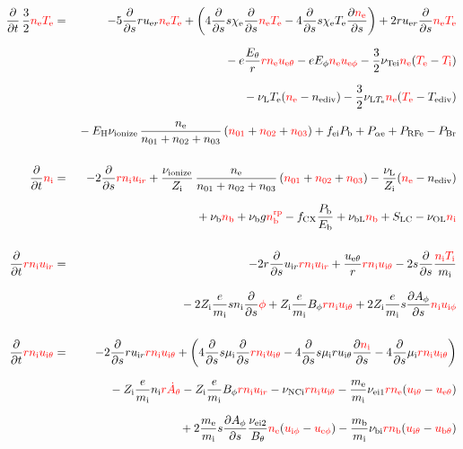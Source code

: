 \documentclass[11pt]{article}
\def\r#1{{\rm#1}}
\def\ddt{\frac{\partial}{\partial t}}
\def\dds{\frac{\partial}{\partial s}}
\def\dd#1{\frac{\partial #1}{\partial s}}
\def\me{m_\r{e}}
\def\mi{m_\r{i}}
\def\mb{m_\r{b}}
\def\mui{\mu_\r{i}}
\def\chie{\chi_\r{e}}
\def\nee{n_\r{e}}
\def\ni{n_\r{i}}
\def\nb{n_\r{b}}
\def\uer{u_{\r{e}r}}
\def\uir{u_{\r{i}r}}
\def\ueth{u_{\r{e}\theta}}
\def\uith{u_{\r{i}\theta}}
\def\ubth{u_{\r{b}\theta}}
\def\ueph{u_{\r{e}\phi}}
\def\uiph{u_{\r{i}\phi}}
\def\ubph{u_{\r{b}\phi}}
\def\Eth{E_\theta}
\def\Eph{E_\phi}
\def\Bth{B_\theta}
\def\Bph{B_\phi}
\def\Athd{\dot{A}_\theta}
\def\Aph{A_\phi}
\def\Te{T_\r{e}}
\def\Ti{T_\r{i}}
\def\nna{n_{01}}
\def\nnb{n_{02}}
\def\nnc{n_{03}}
\def\Zi{Z_\r{i}}
\def\Pb{P_\r{b}}
\def\Eb{E_\r{b}}
\def\PRFe{P_\r{RFe}}
\def\PBr{P_\r{Br}}
\def\EH{E_\r{H}}
\def\fei{f_\r{ei}}
\def\nbrp{n_\r{b}^\r{rp}}
\def\fCX{f_\r{CX}}
\def\Palpe{P_{\alpha\r{e}}}
\def\nuNCi{\nu_\r{NCi}}
\def\nube{\nu_\r{be}}
\def\nubi{\nu_\r{bi}}
\def\nuL{\nu_\r{L}}
\def\nuion{\nu_\r{ionize}}
\def\nub{\nu_\r{b}}
\def\nuTei{\nu_\r{Tei}}
\def\vb{v_\r{b}}
\def\nediv{n_\r{ediv}}
\def\Tediv{T_\r{ediv}}
\def\nuLTe{\nu_{\r{L}T_\r{e}}}
\def\nuOL{\nu_\r{OL}}
\def\nubL{\nu_\r{bL}}
\def\red#1{\textcolor{red}{#1}}
\begin{document}
\begin{eqnarray}
\\[5mm]
  \ddt \, \frac{3}{2} \red{\nee \Te} &=&
%
   - 5 \dds r \uer \red{\nee \Te}
%
   + \left(   4 \dds s \chie \dds \red{\nee \Te}
%
            - 4 \dds s \chie \Te \dd{\red{\nee}} \right)
%
  + 2 r \uer \dds \red{\nee \Te}
%
\nonumber\\[2.5mm]&&{}
%
  -  e \frac{\Eth}{r} \red{r \nee \ueth}
%
  -  e \Eph \red{\nee \ueph} 
%
  - \frac{3}{2} \nuTei \red{\nee} (\red{\Te} - \red{\Ti})
%
%
\nonumber\\[2.5mm]&&{}
%
  - \nuL \Te (\red{\nee} - \nediv)
%
  - \frac{3}{2} \nuLTe \red{\nee} (\red{\Te} - \Tediv)
\nonumber\\[2.5mm]&&{}
%
  - \EH \nuion\, \frac{\nee}{\nna + \nnb + \nnc}\, (\red{\nna} + \red{\nnb} + \red{\nnc})
%
  + \fei \Pb
%
  + \Palpe
%
  + \PRFe
%
  - \PBr
\\[5mm]
  \ddt \red{\ni} &=&
%
  - 2 \dds \red{r \ni \uir}
%
  + \frac{\nuion}{\Zi}\, \frac{\nee}{\nna + \nnb + \nnc}\, (\red{\nna} +
  \red{\nnb} + \red{\nnc})
%
  - \frac{\nuL}{\Zi} (\red{\nee} - \nediv) 
\nonumber\\[2.5mm]&&{}
%
  + \nub \red{\nb}
%
  + \nub g \red{\nbrp}
%
  - \fCX \frac{\Pb}{\Eb}
%
  + \nubL \red{\nb}
%
  + S_\r{LC}
%
  - \nuOL \red{\ni}
\\[5mm]
  \ddt \red{r \ni \uir} &=&
%
  - 2 r \dds \uir \red{r \ni \uir}
%
  + \frac{\ueth}{r} \red{r \ni \uith}
%
  - 2 s \dds \frac{\red{\ni \Ti}}{\mi}
\nonumber\\[3mm]&&{}
%
  - 2 \Zi \frac{e}{\mi} s \ni \dds \red{\phi}
%
  + \Zi \frac{e}{\mi} \Bph \red{r \ni \uith}
%
  + 2 \Zi \frac{e}{\mi} s \dd{\Aph} \red{\ni \uiph}
\\[5mm]
  \ddt \red{r \ni \uith} &=&
%
  - 2 \dds r \uir \red{r \ni \uith}
%
  + \left(   4 \dds s \mui \dds \red{r \ni \uith}
%
           - 4 \dds s \mui r \uith \dd{\red{\ni}}
%
	   - 4 \dds \mui \red{r \ni \uith} \right)
\nonumber\\[2.5mm]&&{}
%
- \Zi \frac{e}{\mi} \ni \red{r \Athd}
%
  - \Zi \frac{e}{\mi} \Bph \red{r \ni \uir}
%
  - \nuNCi \red{r \ni \uith}
%
  - \frac{\me}{\mi} \nu_\r{ei1} \red{r \nee} (\red{\uith} - \red{\ueth})
\nonumber\\[2.5mm]&&{}
%
  + 2 \frac{\me}{\mi} s \dd{\Aph} \frac{\nu_\r{ei2}}{\Bth} \red{\nee} (\red{\uiph} - \red{\ueph})
%
  - \frac{\mb}{\mi} \nubi \red{r \nb} (\red{\uith} - \red{\ubth})

\end{eqnarray}
\end{document}
